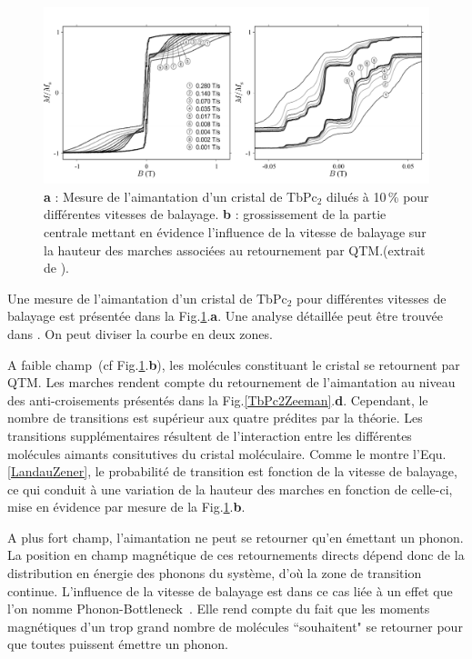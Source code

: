 \begin{figure}
\centering \includegraphics[scale=0.45]{Resultats/MesureAimant/MesureAimant.pdf} 
\caption{\textbf{a} : Mesure de l'aimantation d'un cristal de TbPc$_2$ dilués à 10\,\% pour différentes vitesses de balayage. \textbf{b} : grossissement de la partie centrale mettant en évidence l'influence de la vitesse de balayage sur la hauteur des marches associées au retournement par QTM.(extrait de \cite{Ishikawa2005}).}
\label{TbPc2Aimantation}
\end{figure}


Une mesure de l'aimantation d'un cristal de TbPc$_2$ pour différentes vitesses de balayage est présentée dans la Fig.\ref{TbPc2Aimantation}.\textbf{a}. Une analyse détaillée peut \^etre trouvée dans \cite{Ishikawa2005}. On peut diviser la courbe en deux zones. 

A faible champ~(cf Fig.\ref{TbPc2Aimantation}.\textbf{b}), les molécules constituant le cristal se retournent par QTM. Les marches rendent compte du retournement de l'aimantation au niveau des anti-croisements présentés dans la Fig.\ref{TbPc2Zeeman}.\textbf{d}. Cependant, le nombre de transitions est supérieur aux quatre prédites par la théorie. Les transitions supplémentaires résultent de l'interaction entre les différentes molécules aimants consitutives du cristal moléculaire. Comme le montre l'Equ.\ref{LandauZener}, le probabilité de transition est fonction de la vitesse de balayage, ce qui conduit à une variation de la hauteur des marches en fonction de celle-ci, mise en évidence par mesure de la Fig.\ref{TbPc2Aimantation}.\textbf{b}. 

A plus fort champ, l'aimantation ne peut se retourner qu'en émettant un phonon. La position en champ magnétique de ces retournements directs dépend donc de la distribution en énergie des phonons du système, d'où la zone de transition continue. L'influence de la vitesse de balayage est dans ce cas liée à un effet que l'on nomme Phonon-Bottleneck~\cite{VanVleck1941}. Elle rend compte du fait que les moments magnétiques d'un trop grand nombre de molécules ``souhaitent" se retourner pour que toutes puissent émettre un phonon.

